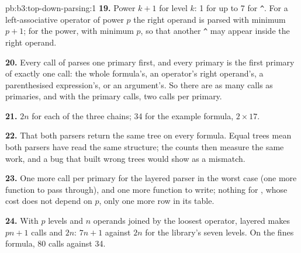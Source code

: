 \begin{solution}{pb:b3:top-down-parsing:1}
\textbf{19.} Power $k + 1$ for level $k$: 1 for  up to 7 for \texttt{\textasciicircum}. For a left-associative operator of power $p$ the right operand is parsed with minimum $p + 1$; for the power, with minimum $p$, so that another \texttt{\textasciicircum} may appear inside the right operand.

\textbf{20.} Every call of  parses one primary first, and every primary is the first primary of exactly one  call: the whole formula's, an operator's right operand's, a parenthesised expression's, or an argument's. So there are as many  calls as primaries, and with the primary calls, two calls per primary.

\textbf{21.} $2n$ for each of the three chains; 34 for the example formula, $2 \times 17$.

\textbf{22.} That both parsers return the same tree on every formula. Equal trees mean both parsers have read the same structure; the counts then measure the same work, and a bug that built wrong trees would show as a mismatch.

\textbf{23.} One more call per primary for the layered parser in the worst case (one more function to pass through), and one more function to write; nothing for , whose cost does not depend on $p$, only one more row in its table.

\textbf{24.} With $p$ levels and $n$ operands joined by the loosest operator, layered  makes $pn + 1$ calls and  $2n$: $7n + 1$ against $2n$ for the library's seven levels. On the fines formula, 80 calls against 34.
\end{solution}
